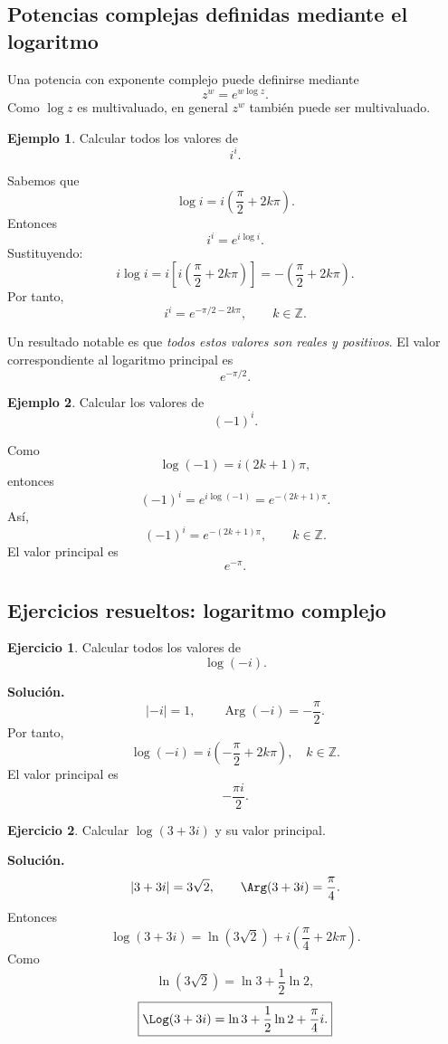 \documentclass[12pt]{article}
\theoremstyle{definition}
\newtheorem{ejemplo}{Ejemplo}[section]
\newtheorem{ejercicio}{Ejercicio}[section]
\theoremstyle{remark}
\begin{document}
\subsection{Potencias complejas definidas mediante el logaritmo}

Una potencia con exponente complejo puede definirse mediante
\[
\boxed{
z^w=e^{w\log z}.
}
\]
Como $\log z$ es multivaluado, en general $z^w$ también puede ser
multivaluado.

\begin{ejemplo}
Calcular todos los valores de
\[
i^i.
\]

Sabemos que
\[
\log i=i\left(\frac{\pi}{2}+2k\pi\right).
\]
Entonces
\[
i^i=e^{i\log i}.
\]
Sustituyendo:
\[
i\log i
=
i\left[
i\left(\frac{\pi}{2}+2k\pi\right)
\right]
=
-\left(\frac{\pi}{2}+2k\pi\right).
\]
Por tanto,
\[
\boxed{
i^i=e^{-\pi/2-2k\pi},
\qquad k\in\mathbb Z.
}
\]

Un resultado notable es que \emph{todos estos valores son reales y positivos}.
El valor correspondiente al logaritmo principal es
\[
\boxed{
e^{-\pi/2}.
}
\]
\end{ejemplo}

\begin{ejemplo}
Calcular los valores de
\[
(-1)^i.
\]

Como
\[
\log(-1)=i(2k+1)\pi,
\]
entonces
\[
(-1)^i
=
e^{i\log(-1)}
=
e^{-(2k+1)\pi}.
\]
Así,
\[
\boxed{
(-1)^i=e^{-(2k+1)\pi},
\qquad k\in\mathbb Z.
}
\]
El valor principal es
\[
\boxed{e^{-\pi}.}
\]
\end{ejemplo}

\subsection{Ejercicios resueltos: logaritmo complejo}

\begin{ejercicio}
Calcular todos los valores de
\[
\log(-i).
\]
\end{ejercicio}

\textbf{Solución.}
\[
|-i|=1,\qquad
\operatorname{Arg}(-i)=-\frac{\pi}{2}.
\]
Por tanto,
\[
\boxed{
\log(-i)
=
i\left(-\frac{\pi}{2}+2k\pi\right),
\quad k\in\mathbb Z.
}
\]
El valor principal es
\[
\boxed{-\frac{\pi i}{2}.}
\]

\begin{ejercicio}
Calcular $\log(3+3i)$ y su valor principal.
\end{ejercicio}

\textbf{Solución.}
\[
|3+3i|=3\sqrt2,\qquad
\Arg(3+3i)=\frac{\pi}{4}.
\]
Entonces
\[
\boxed{
\log(3+3i)
=
\ln(3\sqrt2)
+i\left(\frac{\pi}{4}+2k\pi\right).
}
\]
Como
\[
\ln(3\sqrt2)=\ln3+\frac12\ln2,
\]
\[
\boxed{
\Log(3+3i)
=
\ln3+\frac12\ln2+\frac{\pi}{4}i.
}
\]
\end{document}
